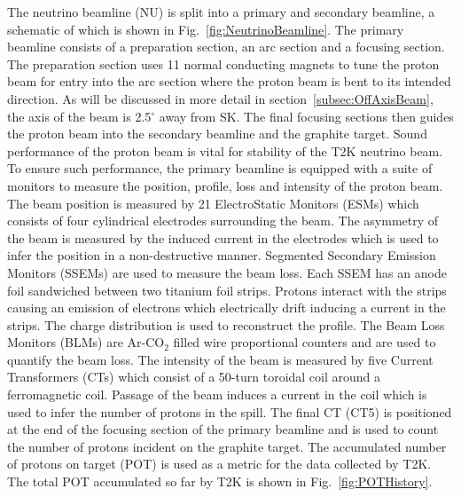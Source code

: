 The neutrino beamline (NU) is split into a primary and secondary beamline, a schematic of which is shown in Fig.~\ref{fig:NeutrinoBeamline}.  The primary beamline consists of a preparation section, an arc section and a focusing section.  The preparation section uses 11 normal conducting magnets to tune the proton beam for entry into the arc section where the proton beam is bent to its intended direction.  As will be discussed in more detail in section~\ref{subsec:OffAxisBeam}, the axis of the beam is 2.5$^\circ$ away from SK.  The final focusing sections then guides the proton beam into the secondary beamline and the graphite target.
\newline
\newline
Sound performance of the proton beam is vital for stability of the T2K neutrino beam.  To ensure such performance, the primary beamline is equipped with a suite of monitors to measure the position, profile, loss and intensity of the proton beam.  The beam position is measured by 21 ElectroStatic Monitors (ESMs) which consists of four cylindrical electrodes surrounding the beam.  The asymmetry of the beam is measured by the induced current in the electrodes which is used to infer the position in a non-destructive manner.  Segmented Secondary Emission Monitors (SSEMs) are used to measure the beam loss.  Each SSEM has an anode foil sandwiched between two titanium foil strips.  Protons interact with the strips causing an emission of electrons which electrically drift inducing a current in the strips.  The charge distribution is used to reconstruct the profile.  The Beam Loss Monitors (BLMs) are Ar-CO$_2$ filled wire proportional counters and are used to quantify the beam loss.  The intensity of the beam is measured by five Current Transformers (CTs) which consist of a 50-turn toroidal coil around a ferromagnetic coil.  Passage of the beam induces a current in the coil which is used to infer the number of protons in the spill.  The final CT (CT5) is positioned at the end of the focusing section of the primary beamline and is used to count the number of protons incident on the graphite target.  The accumulated number of protons on target (POT) is used as a metric for the data collected by T2K.  The total POT accumulated so far by T2K is shown in Fig.~\ref{fig:POTHistory}.
